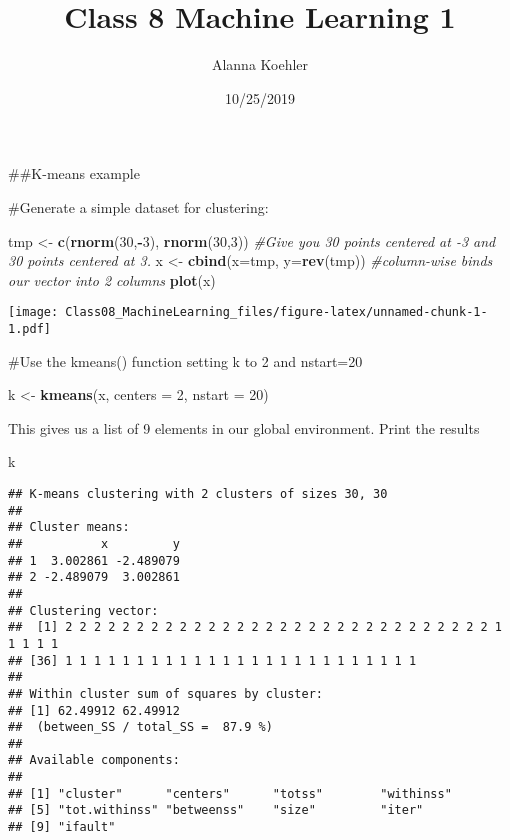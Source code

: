 \documentclass[]{article}
\title{Class 8 Machine Learning 1}
\author{Alanna Koehler}
\date{10/25/2019}
\newenvironment{Shaded}{\begin{snugshade}}{\end{snugshade}}
\newcommand{\CommentTok}[1]{\textcolor[rgb]{0.56,0.35,0.01}{\textit{#1}}}
\newcommand{\DataTypeTok}[1]{\textcolor[rgb]{0.13,0.29,0.53}{#1}}
\newcommand{\DecValTok}[1]{\textcolor[rgb]{0.00,0.00,0.81}{#1}}
\newcommand{\KeywordTok}[1]{\textcolor[rgb]{0.13,0.29,0.53}{\textbf{#1}}}
\newcommand{\NormalTok}[1]{#1}
\newcommand{\OperatorTok}[1]{\textcolor[rgb]{0.81,0.36,0.00}{\textbf{#1}}}
\newcommand{\StringTok}[1]{\textcolor[rgb]{0.31,0.60,0.02}{#1}}
\begin{document}
\maketitle

\#\#K-means example

\#Generate a simple dataset for clustering:

\begin{Shaded}
\begin{Highlighting}[]
\NormalTok{tmp <-}\StringTok{ }\KeywordTok{c}\NormalTok{(}\KeywordTok{rnorm}\NormalTok{(}\DecValTok{30}\NormalTok{,}\OperatorTok{-}\DecValTok{3}\NormalTok{), }\KeywordTok{rnorm}\NormalTok{(}\DecValTok{30}\NormalTok{,}\DecValTok{3}\NormalTok{)) }\CommentTok{#Give you 30 points centered at -3 and 30 points centered at 3.}
\NormalTok{x <-}\StringTok{ }\KeywordTok{cbind}\NormalTok{(}\DataTypeTok{x=}\NormalTok{tmp, }\DataTypeTok{y=}\KeywordTok{rev}\NormalTok{(tmp)) }\CommentTok{#column-wise binds our vector into 2 columns}
\KeywordTok{plot}\NormalTok{(x)}
\end{Highlighting}
\end{Shaded}

\texttt{[image: Class08\_MachineLearning\_files/figure-latex/unnamed-chunk-1-1.pdf]}

\#Use the kmeans() function setting k to 2 and nstart=20

\begin{Shaded}
\begin{Highlighting}[]
\NormalTok{k <-}\StringTok{ }\KeywordTok{kmeans}\NormalTok{(x, }\DataTypeTok{centers =} \DecValTok{2}\NormalTok{, }\DataTypeTok{nstart =} \DecValTok{20}\NormalTok{)}
\end{Highlighting}
\end{Shaded}

This gives us a list of 9 elements in our global environment. Print the
results

\begin{Shaded}
\begin{Highlighting}[]
\NormalTok{k}
\end{Highlighting}
\end{Shaded}

\begin{verbatim}
## K-means clustering with 2 clusters of sizes 30, 30
## 
## Cluster means:
##           x         y
## 1  3.002861 -2.489079
## 2 -2.489079  3.002861
## 
## Clustering vector:
##  [1] 2 2 2 2 2 2 2 2 2 2 2 2 2 2 2 2 2 2 2 2 2 2 2 2 2 2 2 2 2 2 1 1 1 1 1
## [36] 1 1 1 1 1 1 1 1 1 1 1 1 1 1 1 1 1 1 1 1 1 1 1 1 1
## 
## Within cluster sum of squares by cluster:
## [1] 62.49912 62.49912
##  (between_SS / total_SS =  87.9 %)
## 
## Available components:
## 
## [1] "cluster"      "centers"      "totss"        "withinss"    
## [5] "tot.withinss" "betweenss"    "size"         "iter"        
## [9] "ifault"
\end{verbatim}
\end{document}
